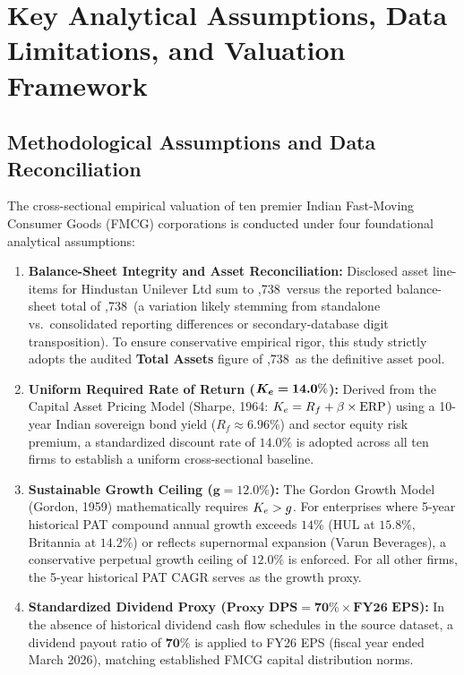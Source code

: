 
\section[Assumptions \& Framework]{Key Analytical Assumptions, Data Limitations, and Valuation Framework}

\subsection{Methodological Assumptions and Data Reconciliation}
The cross-sectional empirical valuation of ten premier Indian Fast-Moving Consumer Goods (FMCG) corporations is conducted under four foundational analytical assumptions:

\begin{enumerate}[label=\textbf{\arabic*.}, topsep=2pt, itemsep=2pt, parsep=0pt]
    \item \textbf{Balance-Sheet Integrity and Asset Reconciliation:} Disclosed asset line-items for Hindustan Unilever Ltd sum to ,738\crunit\ versus the reported balance-sheet total of ,738\crunit\ (a variation likely stemming from standalone vs.\ consolidated reporting differences or secondary-database digit transposition). To ensure conservative empirical rigor, this study strictly adopts the audited \textbf{Total Assets} figure of ,738\crunit\ as the definitive asset pool.
    \item \textbf{Uniform Required Rate of Return ($\bm{K_e = 14.0\%}$):} Derived from the Capital Asset Pricing Model (Sharpe, 1964: $K_e = R_f + \beta \times \text{ERP}$) using a 10-year Indian sovereign bond yield ($R_f \approx 6.96\%$) and sector equity risk premium, a standardized discount rate of \textbf{$\bm{14.0\%}$} is adopted across all ten firms to establish a uniform cross-sectional baseline.
    \item \textbf{Sustainable Growth Ceiling ($\bm{g = 12.0\%}$):} The Gordon Growth Model (Gordon, 1959) mathematically requires $K_e > g$. For enterprises where 5-year historical PAT compound annual growth exceeds $14\%$ (HUL at $15.8\%$, Britannia at $14.2\%$) or reflects supernormal expansion (Varun Beverages), a conservative perpetual growth ceiling of \textbf{$\bm{12.0\%}$} is enforced. For all other firms, the 5-year historical PAT CAGR serves as the growth proxy.
    \item \textbf{Standardized Dividend Proxy ($\bm{\text{Proxy DPS} = 70\%\times\text{FY26 EPS}}$):} In the absence of historical dividend cash flow schedules in the source dataset, a dividend payout ratio of \textbf{$\bm{70\%}$} is applied to FY26 EPS (fiscal year ended March 2026), matching established FMCG capital distribution norms.
\end{enumerate}

